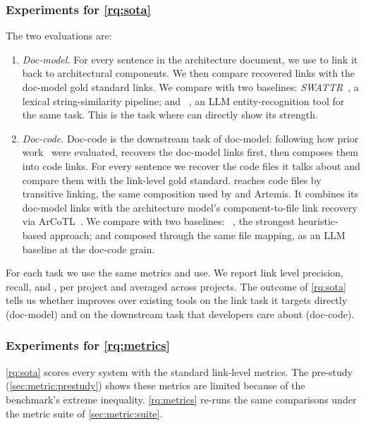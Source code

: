 \subsubsection{Experiments for \ref{rq:sota}}
\label{sec:exp:rq1}
The two evaluations are:
\begin{enumerate}[leftmargin=*]
    \item \emph{Doc-model.} For every sentence in the architecture document, we use \approach to link it back to architectural components.
     We then compare recovered links with the doc-model gold standard links. 
    We compare \approach{} with two baselines: \emph{SWATTR}~\cite{keim_trace_2021}, a lexical string-similarity pipeline; and \Artemis{}~\cite{fuchs_whos_2025}, an \ac{LLM} entity-recognition tool for the same task.
    This is the task where \approach{} can directly show its strength.
    \item \emph{Doc-code.} Doc-code is the downstream task of doc-model: following how prior work~\cite{fuchs_whos_2025,keim_recovering_2024} were evaluated, \approach{} recovers the doc-model links first, then composes them into code links. 
    For every sentence we recover the code files it talks about and compare them with the link-level gold standard. 
    \approach{} reaches code files by transitive linking, the same composition used by \TransArc{} and Artemis\cite{fuchs_whos_2025}.
    It combines its doc-model links with the architecture model's component-to-file link recovery via ArCoTL~\cite{keim_recovering_2024}. 
    We compare \approach{} with two baselines: \TransArc{}~\cite{keim_recovering_2024}, the strongest heuristic-based approach; 
    and \Artemis{} composed through the same \TransArc{} file mapping, as an \ac{LLM} baseline at the doc-code grain.
\end{enumerate}
For each task we use the same metrics \TransArc{} and \Artemis{} use.
We report link level precision, recall, and \fone, \ftwo per project and averaged across projects.
The outcome of \ref{rq:sota} tells us whether \approach{} improves over existing tools on the link task it targets directly (doc-model) and on the downstream task that developers care about (doc-code).


\subsubsection{Experiments for \ref{rq:metrics}}
\label{sec:exp:rq2}
\ref{rq:sota} scores every system with the standard link-level metrics.
The pre-study (\autoref{sec:metric:prestudy}) shows these metrics are limited because of the benchmark's extreme inequality.
\ref{rq:metrics} re-runs the same comparisons under the metric suite of \autoref{sec:metric:suite}.

